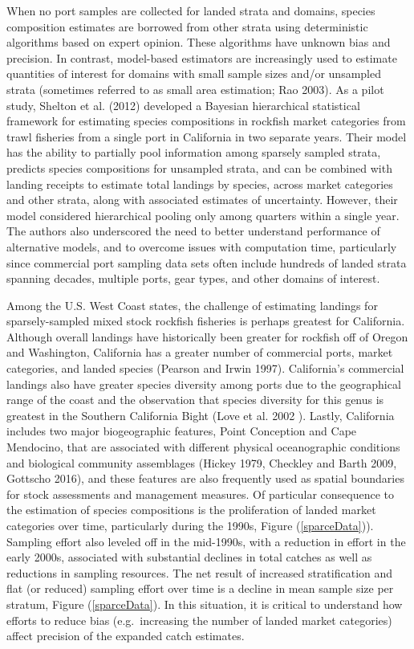 \documentclass[12pt]{article}
\begin{document}
When no port samples are collected for landed strata and domains,
species composition estimates are borrowed from other strata using
deterministic algorithms based on expert opinion. These algorithms have
unknown bias and precision. In contrast, model-based estimators are
increasingly used to estimate quantities of interest for domains with
small sample sizes and/or unsampled strata (sometimes referred to as
small area estimation; Rao 2003). As a pilot study, Shelton et al.
(2012) developed a Bayesian hierarchical statistical framework for
estimating species compositions in rockfish market categories from trawl
fisheries from a single port in California in two separate years. Their
model has the ability to partially pool information among sparsely
sampled strata, predicts species compositions for unsampled strata, and
can be combined with landing receipts to estimate total landings by
species, across market categories and other strata, along with
associated estimates of uncertainty. However, their model considered
hierarchical pooling only among quarters within a single year. The
authors also underscored the need to better understand performance of
alternative models, and to overcome issues with computation time,
particularly since commercial port sampling data sets often include
hundreds of landed strata spanning decades, multiple ports, gear types,
and other domains of interest.

Among the U.S. West Coast states, the challenge of estimating landings
for sparsely-sampled mixed stock rockfish fisheries is perhaps greatest
for California. Although overall landings have historically been greater
for rockfish off of Oregon and Washington, California has a greater
number of commercial ports, market categories, and landed species
(Pearson and Irwin 1997). California's commercial landings also have greater 
species diversity among ports due to the geographical range of the coast and 
the observation that species diversity for this genus is greatest in the 
Southern California Bight (Love et al. 2002 ). Lastly, California includes two 
major biogeographic features, Point Conception and Cape Mendocino, that are 
associated with different physical oceanographic conditions and biological 
community assemblages (Hickey 1979, Checkley and Barth 2009, Gottscho 2016), 
and these features are also frequently used as spatial boundaries for 
stock assessments and management measures. Of particular consequence to 
the estimation of species compositions is the proliferation of landed 
market categories over time, particularly during the 1990s, 
Figure (\ref{sparceData})). Sampling effort also leveled off in the mid-1990s, 
with a reduction in effort in the early 2000s, associated with 
substantial declines in total catches as well as reductions in sampling 
resources. The net result of increased stratification and flat (or 
reduced) sampling effort over time is a decline in mean sample size per 
stratum, Figure (\ref{sparceData}). In this situation, it is critical 
to understand how efforts to reduce bias (e.g.~increasing the number of landed 
market categories) affect precision of the expanded catch estimates.
\end{document}
